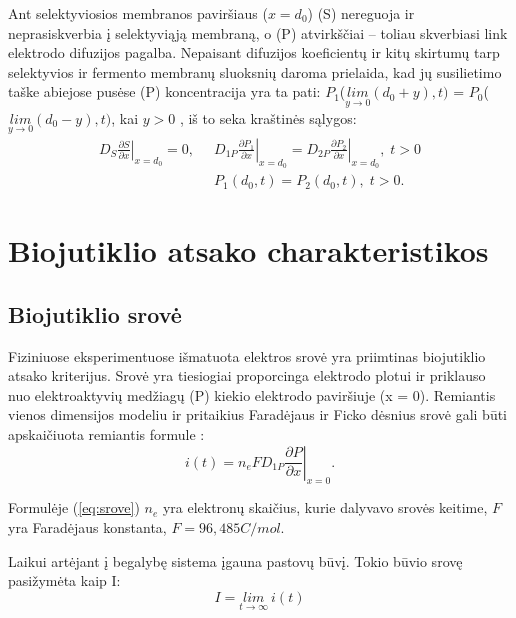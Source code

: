 \documentclass[12pt, a4paper, lithuanian]{article}
\begin{document}
Ant selektyviosios membranos paviršiaus ($x = d_0$) (S) nereguoja ir neprasiskverbia į
selektyviąją membraną, o (P) atvirkščiai – toliau skverbiasi link elektrodo
difuzijos pagalba. Nepaisant difuzijos koeficientų ir kitų skirtumų tarp selektyvios ir
fermento membranų sluoksnių daroma prielaida, kad jų susilietimo taške abiejose
pusėse (P) koncentracija yra ta pati: $P_1$($\underset{y \to 0}{lim}(d_0 + y), t)$ =
$P_0$($\underset{y \to 0}{lim}(d_0 - y), t)$, kai $y > 0$  , iš to seka kraštinės sąlygos:
\begin{equation} 
\begin{aligned}
    \left. D_S \frac{\partial S}{\partial x} \right|_{x=d_0} = 0, \;\;
    & \left. D_{1P} \frac{\partial P_1}{\partial x} \right|_{x=d_0} = 
    \left. D_{2P} \frac{\partial P_2}{\partial x} \right|_{x=d_0},\; t > 0 \\
    & P_1(d_0, t) = P_2(d_0, t),\; t>0.
\end{aligned}
\end{equation}

\section{Biojutiklio atsako charakteristikos}
\subsection{Biojutiklio srovė}

Fiziniuose eksperimentuose išmatuota elektros srovė yra priimtinas
biojutiklio atsako kriterijus. Srovė yra tiesiogiai proporcinga elektrodo
plotui ir priklauso nuo elektroaktyvių medžiagų (P)
kiekio elektrodo paviršiuje (x = 0). Remiantis vienos dimensijos modeliu
ir pritaikius Faradėjaus ir Ficko dėsnius srovė gali būti apskaičiuota
remiantis formule \cite{baronas2009mathematical}:
\begin{equation}
    \label{eq:srove}
    \left. i(t) = n_eFD_{1P}\frac{\partial P}{\partial x} \right|_{x=0}.
\end{equation}

Formulėje (\ref{eq:srove}) $n_e$ yra elektronų skaičius, kurie dalyvavo srovės
keitime, $F$ yra Faradėjaus konstanta, $F = 96,485 C/mol$.

Laikui artėjant į begalybę sistema įgauna pastovų būvį. Tokio būvio srovę
pasižymėta kaip I:
\begin{equation}
    I = \underset{t \to \infty}{lim} \ i(t)
\end{equation}
\end{document}
